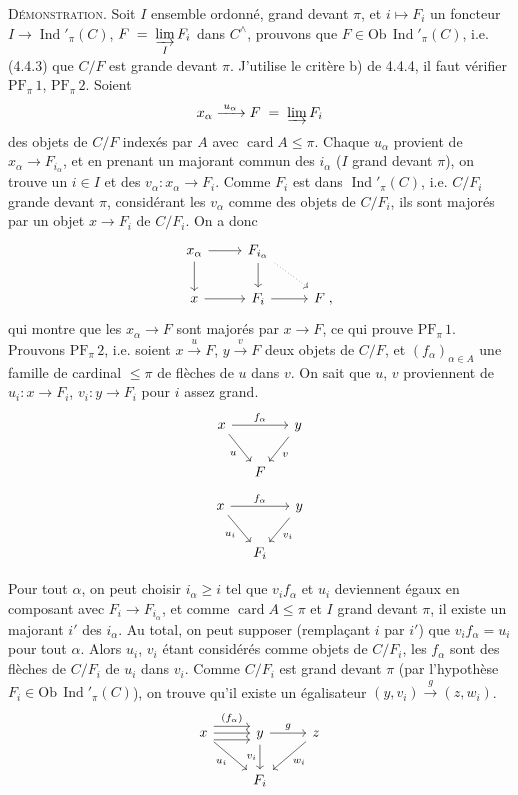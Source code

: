 \documentclass[11pt]{article}
\newcommand{\printedpage}[1]{\if\relax\detokenize{#1}\relax\else\marginpar{\footnotesize p.~#1}\fi}
\newcommand{\msp}[1]{\marginpar{\footnotesize [#1]}}
\newcommand{\Ob}{\mathrm{Ob}\,}
\newcommand{\card}{\operatorname{card}}
\newcommand{\Ind}{\operatorname{Ind}}
\newcommand{\PF}{\mathrm{PF}}
\begin{document}
\textsc{Démonstration}. Soit $I$ ensemble ordonné, grand devant $\pi$, et $i\longmapsto F_i$ un foncteur $I\longrightarrow\Ind'_\pi(C)$, $F\;=\;\varinjlim\limits_{I}F_i$ dans $C^\wedge$, prouvons que $F\in\Ob\Ind'_\pi(C)$, i.e. (4.4.3) que $C/F$ est grande devant $\pi$. J'utilise le critère b) de 4.4.4, il faut vérifier $\PF_\pi\,1$, $\PF_\pi\,2$. Soient
\[
x_\alpha\xrightarrow{\;u_\alpha\;}F\;=\;\varinjlim F_i
\]
des objets de $C/F$ indexés par $A$ avec $\card A\leqslant\pi$. Chaque $u_\alpha$ provient de $x_\alpha\longrightarrow F_{i_\alpha}$, et en prenant un majorant commun des $i_\alpha$ ($I$ grand devant $\pi$), on trouve un $i\in I$ et des $v_\alpha:x_\alpha\longrightarrow F_i$. Comme $F_i$ est dans $\Ind'_\pi(C)$, i.e. $C/F_i$ grande devant $\pi$, considérant les $v_\alpha$ comme des objets de $C/F_i$, ils sont majorés par un objet $x\longrightarrow F_i$ de $C/F_i$. On a donc
\[
\begin{tikzcd}
x_\alpha \arrow[r] \arrow[d] & F_{i_\alpha} \arrow[d] \arrow[dr, dotted] & \\
x \arrow[r] & F_i \arrow[r] & F\;,
\end{tikzcd}
\]
qui montre que les $x_\alpha\longrightarrow F$ sont majorés par $x\longrightarrow F$,
\msp{page 100}
ce qui prouve $\PF_\pi\,1$. Prouvons $\PF_\pi\,2$, i.e. soient $x\xrightarrow{\;u\;}F$, $y\xrightarrow{\;v\;}F$ deux objets de $C/F$, et $(f_\alpha)_{\alpha\in A}$ une famille de cardinal $\leqslant\pi$ de flèches de $u$ dans $v$. On sait que $u$, $v$ proviennent de $u_i:x\longrightarrow F_i$, $v_i:y\longrightarrow F_i$ pour $i$ assez grand.
\[
\begin{tikzcd}[column sep=small]
x \arrow[rr, "f_\alpha"] \arrow[dr, "u"'] & & y \arrow[dl, "v"] \\
& F &
\end{tikzcd}
\]
\[
\begin{tikzcd}[column sep=small]
x \arrow[rr, "f_\alpha"] \arrow[dr, "u_i"'] & & y \arrow[dl, "v_i"] \\
& F_i &
\end{tikzcd}
\]

Pour tout $\alpha$, on peut choisir $i_\alpha\geqslant i$ tel que $v_if_\alpha$ et $u_i$ deviennent égaux en composant avec $F_i\longrightarrow F_{i_\alpha}$, et comme $\card A\leqslant\pi$ et $I$ grand devant $\pi$, il existe un majorant $i'$ des $i_\alpha$. Au total, on peut supposer (remplaçant $i$ par $i'$) que $v_if_\alpha=u_i$ pour tout $\alpha$. Alors $u_i$, $v_i$ étant considérés comme objets de $C/F_i$, les $f_\alpha$ sont des flèches de $C/F_i$ de $u_i$ dans $v_i$. Comme $C/F_i$ est grand devant $\pi$ (par l'hypothèse $F_i\in\Ob\Ind'_\pi(C)$), on trouve qu'il existe un égalisateur $(y,v_i)\xrightarrow{\;g\;}(z,w_i)$.
\printedpage{26}
\[
\begin{tikzcd}
x \arrow[r, shift left=2, "(f_\alpha)"] \arrow[r] \arrow[r, shift right=2] \arrow[dr, "u_i"'] & y \arrow[r, "g"] \arrow[d, "v_i"'] & z \arrow[dl, "w_i"] \\
& F_i &
\end{tikzcd}
\]
\end{document}
